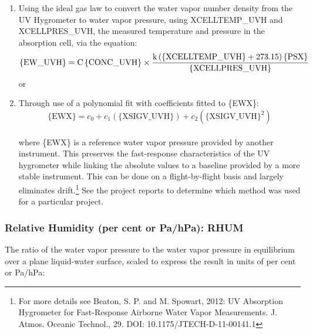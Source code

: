 \documentclass[
  english,
]{book}
\providecommand{\tightlist}{%
  \setlength{\itemsep}{0pt}\setlength{\parskip}{0pt}}
\begin{document}
\begin{enumerate}
\def\labelenumi{\arabic{enumi}.}
\tightlist
\item
  Using the ideal gas law to convert the water vapor number density from the UV Hygrometer to water vapor pressure, using XCELLTEMP\_UVH and XCELLPRES\_UVH, the measured temperature and pressure in the absorption cell, via the equation:\\
  \begin{equation}
  \mathrm{\{EW\_UVH\}=C\,\{CONC\_UVH\}\notag \\
  \times\frac{k\,(\mathrm{\{XCELLTEMP\_UVH\}+273.15)\,\mathrm{\{PSX\}}}}{\mathrm{{\{XCELLPRES\_UVH\}}}}}
  \label{eq:UVH1}
  \end{equation}
  or\\
\item
  Through use of a polynomial fit with coefficients fitted to \{EWX\}:\\
  \begin{equation}
  \mathrm{\{EWX\}}=c_0 + c_1(\mathrm{\{XSIGV\_UVH\}}) + c_2(\mathrm{\{XSIGV\_UVH\}}^2)
  \label{eq:UVH2}
  \end{equation}\\
  where \{EWX\} is a reference water vapor pressure provided by another instrument. This preserves the fast-response characteristics of the UV hygrometer while linking the absolute values to a baseline provided by a more stable instrument. This can be done on a flight-by-flight basis and largely eliminates drift.\footnote{For more details see Beaton, S. P. and M. Spowart, 2012: UV Absorption Hygrometer for Fast-Response Airborne Water Vapor Measurements. J. Atmos. Oceanic Technol., 29. DOI: 10.1175/JTECH-D-11-00141.1}
  See the project reports to determine which method was used for a particular project.
\end{enumerate}

\hypertarget{rhumw}{%
\subsubsection*{Relative Humidity (per cent or Pa/hPa): RHUM}\label{rhumw}}

The ratio of the water vapor pressure to the water vapor pressure in equilibrium over a plane liquid-water surface, scaled to express the result in units of per cent or Pa/hPa:
\end{document}
